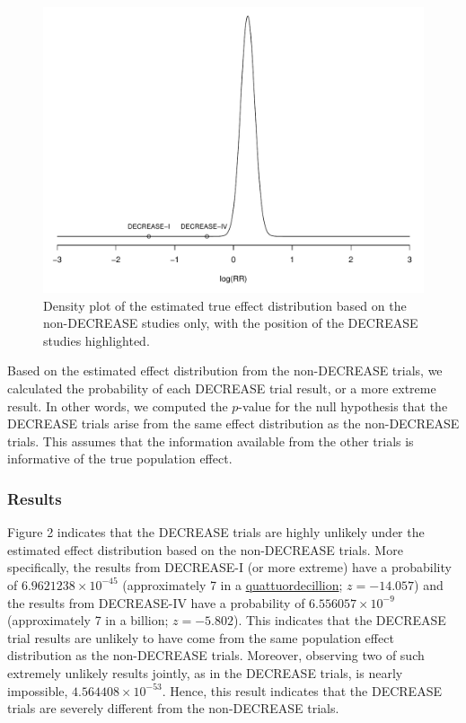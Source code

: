 \documentclass[]{article}
\begin{document}
\begin{figure}

{\centering \includegraphics[width=0.8\linewidth]{../figures/fig1} 

}

\caption{Density plot of the estimated true effect distribution based on the non-DECREASE studies only, with the position of the DECREASE studies highlighted.}\label{fig:figure 1}
\end{figure}

Based on the estimated effect distribution from the non-DECREASE trials,
we calculated the probability of each DECREASE trial result, or a more
extreme result. In other words, we computed the \(p\)-value for the null
hypothesis that the DECREASE trials arise from the same effect
distribution as the non-DECREASE trials. This assumes that the
information available from the other trials is informative of the true
population effect.

\subsubsection{Results}\label{results-1}

Figure 2 indicates that the DECREASE trials are highly unlikely under
the estimated effect distribution based on the non-DECREASE trials. More
specifically, the results from DECREASE-I (or more extreme) have a
probability of \(6.9621238\times 10^{-45}\) (approximately 7 in a
\href{https://en.wikipedia.org/wiki/Names_of_large_numbers}{quattuordecillion};
\(z=-14.057\)) and the results from DECREASE-IV have a probability of
\(6.556057\times 10^{-9}\) (approximately 7 in a billion; \(z=-5.802\)).
This indicates that the DECREASE trial results are unlikely to have come
from the same population effect distribution as the non-DECREASE trials.
Moreover, observing two of such extremely unlikely results jointly, as
in the DECREASE trials, is nearly impossible,
\(4.564408\times 10^{-53}\). Hence, this result indicates that the
DECREASE trials are severely different from the non-DECREASE trials.
\end{document}
